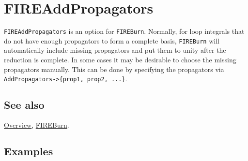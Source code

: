 \documentclass[../FeynHelpersManual.tex]{subfiles}
\begin{document}
\hypertarget{fireaddpropagators}{
\section{FIREAddPropagators}\label{fireaddpropagators}}

\texttt{FIREAddPropagators} is an option for \texttt{FIREBurn}.
Normally, for loop integrals that do not have enough propagators to form
a complete basis, \texttt{FIREBurn} will automatically include missing
propagators and put them to unity after the reduction is complete. In
some cases it may be desirable to choose the missing propagators
manually. This can be done by specifying the propagators via
\texttt{AddPropagators->\{\allowbreak{}prop1,\ \allowbreak{}prop2,\ \allowbreak{}...\}}.

\subsection{See also}

\hyperlink{toc}{Overview}, \hyperlink{fireburn}{FIREBurn}.

\subsection{Examples}
\end{document}

